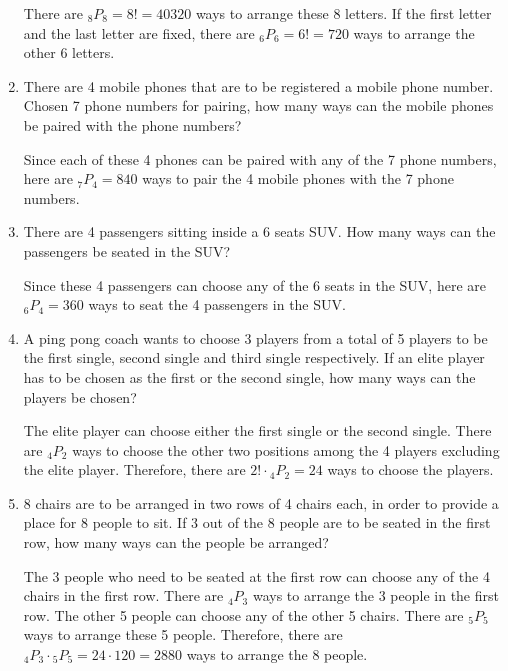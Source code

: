 \documentclass{report}
\newcommand\permtwo[2][^n]{{}_{#1}P_{#2}}
\begin{document}
\begin{multicols}{2}
\begin{enumerate}
          There are $\permtwo[8]{8} = 8! = 40320$ ways to arrange these 8 letters. If the
          first letter and the last letter are fixed, there are $\permtwo[6]{6} = 6! =
            720$ ways to arrange the other 6 letters.

    \item There are 4 mobile phones that are to be registered a mobile phone number.
          Chosen 7 phone numbers for pairing, how many ways can the mobile phones be
          paired with the phone numbers? \sol{}

          Since each of these 4 phones can be paired with any of the 7 phone numbers,
          here are $\permtwo[7]{4} = 840$ ways to pair the 4 mobile phones with the 7
          phone numbers.

    \item There are 4 passengers sitting inside a 6 seats SUV. How many ways can the
          passengers be seated in the SUV? \sol{}

          Since these 4 passengers can choose any of the 6 seats in the SUV, here are
          $\permtwo[6]{4} = 360$ ways to seat the 4 passengers in the SUV.

    \item A ping pong coach wants to choose 3 players from a total of 5 players to be the
          first single, second single and third single respectively. If an elite player
          has to be chosen as the first or the second single, how many ways can the
          players be chosen?

          \sol{}

          The elite player can choose either the first single or the second single. There
          are $\permtwo[4]{2}$ ways to choose the other two positions among the 4 players
          excluding the elite player. Therefore, there are $2! \cdot \permtwo[4]{2} = 24$
          ways to choose the players.

    \item 8 chairs are to be arranged in two rows of 4 chairs each, in order to provide a place for 8 people to sit. If 3 out of the 8 people are to be seated in the first row, how many ways can the people be arranged?
          \sol{}

          The 3 people who need to be seated at the first row can choose any of the 4
          chairs in the first row. There are $\permtwo[4]{3}$ ways to arrange the 3
          people in the first row. The other 5 people can choose any of the other 5
          chairs. There are $\permtwo[5]{5}$ ways to arrange these 5 people. Therefore,
          there are $\permtwo[4]{3} \cdot \permtwo[5]{5} = 24 \cdot 120 = 2880$ ways to
          arrange the 8 people.


\end{enumerate}
\end{multicols}
\end{document}
